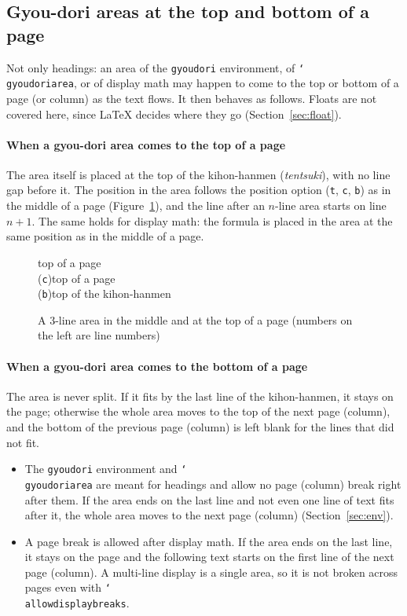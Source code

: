\documentclass[paper=a4,dvipdfmx]{jlreq}
\newcommand\opt[1]{\texttt{#1}}
\newcommand\env[1]{\texttt{#1}}
\newcommand\cs[1]{\texttt{\char`\\#1}}
\begin{document}
\subsection{Gyou-dori areas at the top and bottom of a page}\label{sec:edge}

Not only headings: an area of the \env{gyoudori} environment, of
\cs{gyoudoriarea}, or of display math may happen to come to the top or bottom of
a page (or column) as the text flows. It then behaves as follows. Floats are not
covered here, since \LaTeX{} decides where they go (Section~\ref{sec:float}).

\paragraph{When a gyou-dori area comes to the top of a page}
The area itself is placed at the top of the kihon-hanmen (\emph{tentsuki}), with
no line gap before it. The position in the area follows the position option
(\opt{t}, \opt{c}, \opt{b}) as in the middle of a page
(Figure~\ref{fig:top}), and the line after an $n$-line area starts on line
$n+1$. The same holds for display math: the formula is placed in the area at the
same position as in the middle of a page.

\begin{figure}[htbp]
  \centering
  \GyFigTop{heading}{middle of a page\\(\opt{c})}{top of a page\\(\opt{t})}%
    {top of a page\\(\opt{c})}{top of a page\\(\opt{b})}{top of the kihon-hanmen}
  \caption{A 3-line area in the middle and at the top of a page (numbers on the
    left are line numbers)}
  \label{fig:top}
\end{figure}

\paragraph{When a gyou-dori area comes to the bottom of a page}
The area is never split. If it fits by the last line of the kihon-hanmen, it
stays on the page; otherwise the whole area moves to the top of the next page
(column), and the bottom of the previous page (column) is left blank for the
lines that did not fit.
\begin{itemize}
\item The \env{gyoudori} environment and \cs{gyoudoriarea} are meant for
  headings and allow no page (column) break right after them. If the area ends
  on the last line and not even one line of text fits after it, the whole area
  moves to the next page (column) (Section~\ref{sec:env}).
\item A page break is allowed after display math. If the area ends on the last
  line, it stays on the page and the following text starts on the first line of
  the next page (column). A multi-line display is a single area, so it is not
  broken across pages even with \cs{allowdisplaybreaks}.
\end{itemize}
\end{document}
